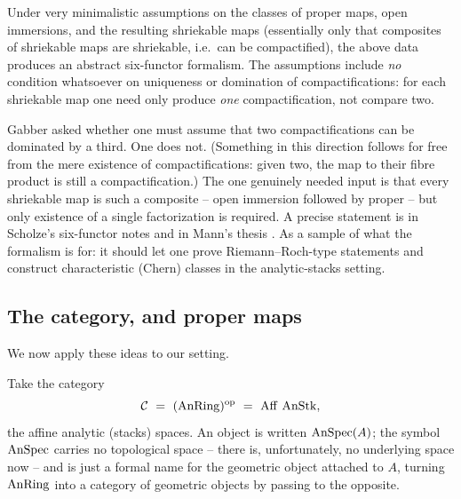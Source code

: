 \begin{theorem}
\label{thm:16:liu-zheng-mann}
Under very minimalistic assumptions on the classes of proper maps, open immersions,
and the resulting shriekable maps (essentially only that composites of shriekable maps
are shriekable, i.e.\ can be compactified), the above data produces an abstract
six-functor formalism. The assumptions include \emph{no} condition whatsoever on
uniqueness or domination of compactifications: for each shriekable map one need only
produce \emph{one} compactification, not compare two.
\end{theorem}

\begin{remark}
\label{rmk:16:no-uniqueness}
Gabber asked whether one must assume that two compactifications can be dominated by a
third. One does not. (Something in this direction follows for free from the mere
existence of compactifications: given two, the map to their fibre product is still a
compactification.) The one genuinely needed input is that every shriekable map is such
a composite -- open immersion followed by proper -- but only existence of a single
factorization is required. A precise statement is in Scholze's six-functor notes
\cite{scholze2023six} and in Mann's thesis \cite{mann2022padic6functorformalismrigidanalytic}.
As a sample of what the formalism is for: it should let one prove Riemann--Roch-type
statements and construct characteristic (Chern) classes in the analytic-stacks setting.
\end{remark}

\subsection{The category, and proper maps}
\label{subsec:16:proper}

We now apply these ideas to our setting.

\begin{notation}
\label{not:16:aff-anstk}
Take the category
\begin{equation*}
\mathcal C\ =\ (\AnRing)^{\mathrm{op}}\ =\ \Aff\,\AnStk,
\end{equation*}
the affine analytic (stacks) spaces. An object is written $\operatorname{AnSpec}(A)$; the symbol
$\operatorname{AnSpec}$ carries no topological space -- there is, unfortunately, no underlying
space now -- and is just a formal name for the geometric object attached to $A$,
turning $\operatorname{AnRing}$ into a category of geometric objects by passing to the opposite.
\end{notation}

